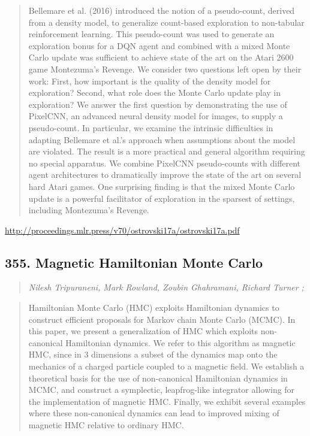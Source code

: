 \documentclass{article}
\begin{document}
\begin{quote}
    Bellemare et al. (2016) introduced the notion of a pseudo-count, derived from a density model, to generalize count-based exploration to non-tabular reinforcement learning. This pseudo-count was used to generate an exploration bonus for a DQN agent and combined with a mixed Monte Carlo update was sufficient to achieve state of the art on the Atari 2600 game Montezuma’s Revenge. We consider two questions left open by their work: First, how important is the quality of the density model for exploration? Second, what role does the Monte Carlo update play in exploration? We answer the first question by demonstrating the use of PixelCNN, an advanced neural density model for images, to supply a pseudo-count. In particular, we examine the intrinsic difficulties in adapting Bellemare et al.’s approach when assumptions about the model are violated. The result is a more practical and general algorithm requiring no special apparatus. We combine PixelCNN pseudo-counts with different agent architectures to dramatically improve the state of the art on several hard Atari games. One surprising finding is that the mixed Monte Carlo update is a powerful facilitator of exploration in the sparsest of settings, including Montezuma’s Revenge.  
\end{quote}

\href{http://proceedings.mlr.press/v70/ostrovski17a/ostrovski17a.pdf}{http://proceedings.mlr.press/v70/ostrovski17a/ostrovski17a.pdf}

\subsection{355. Magnetic Hamiltonian Monte Carlo}

\begin{quote}
\footnotesize{\textit{Nilesh Tripuraneni, Mark Rowland, Zoubin Ghahramani, Richard Turner ;}}

\end{quote}

\begin{quote}
    Hamiltonian Monte Carlo (HMC) exploits Hamiltonian dynamics to construct efficient proposals for Markov chain Monte Carlo (MCMC). In this paper, we present a generalization of HMC which exploits non-canonical Hamiltonian dynamics. We refer to this algorithm as magnetic HMC, since in 3 dimensions a subset of the dynamics map onto the mechanics of a charged particle coupled to a magnetic field. We establish a theoretical basis for the use of non-canonical Hamiltonian dynamics in MCMC, and construct a symplectic, leapfrog-like integrator allowing for the implementation of magnetic HMC. Finally, we exhibit several examples where these non-canonical dynamics can lead to improved mixing of magnetic HMC relative to ordinary HMC.  
\end{quote}
\end{document}
